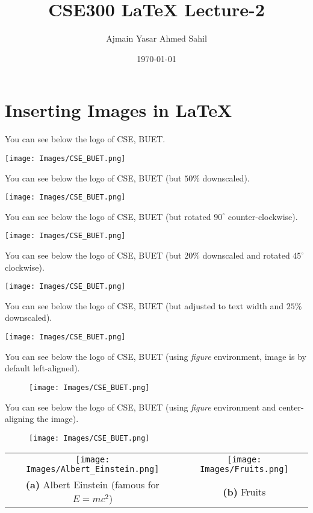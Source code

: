 \documentclass[12pt]{article}
\title{CSE300 LaTeX Lecture-2}
\author{Ajmain Yasar Ahmed Sahil}
\date{\today}
\begin{document}
    \maketitle
    \listoffigures
    
    \pagebreak
    
    \section*{Inserting Images in \LaTeX}
    You can see below the logo of CSE, BUET.
    
    \texttt{[image: Images/CSE\_BUET.png]}
    
    You can see below the logo of CSE, BUET (but $50\%$ downscaled).
    
    \texttt{[image: Images/CSE\_BUET.png]}
    
    \pagebreak
    
    You can see below the logo of CSE, BUET (but rotated $90^{\circ}$ counter-clockwise).
    
    \texttt{[image: Images/CSE\_BUET.png]}
    
    You can see below the logo of CSE, BUET (but $20\%$ downscaled and rotated $45^{\circ}$ clockwise).
    
    \texttt{[image: Images/CSE\_BUET.png]}
    
    \pagebreak
    
    You can see below the logo of CSE, BUET (but adjusted to text width and $25\%$ downscaled).
    
    \texttt{[image: Images/CSE\_BUET.png]}
    
    You can see below the logo of CSE, BUET (using \textit{figure} environment, image is by default left-aligned).
    
    \begin{figure}[h]
        \texttt{[image: Images/CSE\_BUET.png]}
    \end{figure}
    
    You can see below the logo of CSE, BUET (using \textit{figure} environment and center-aligning the image).
    
    \begin{figure}[h]
        \centering
        \texttt{[image: Images/CSE\_BUET.png]}
    \end{figure}
    
    \begin{table}[h]
        \centering
        \begin{tabular}{c c}
             \texttt{[image: Images/Albert\_Einstein.png]} & \texttt{[image: Images/Fruits.png]} \\
             \textbf{(a)} Albert Einstein (famous for $E = mc^2$) & \textbf{(b)} Fruits
        \end{tabular}
    \end{table}
    
\end{document}
